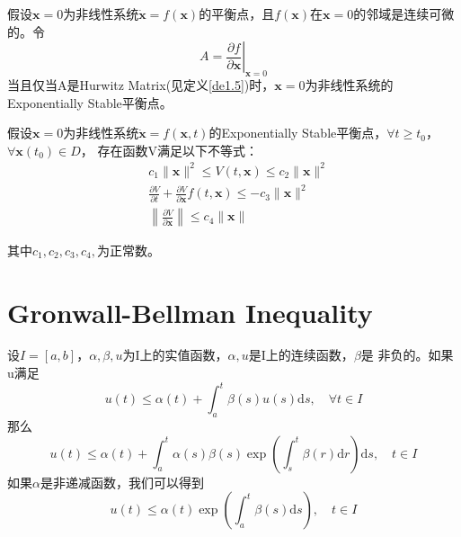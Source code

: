 \documentclass[lang=cn,10pt]{elegantbook}
\newcommand\bv[1]{\boldsymbol{#1}}
\begin{document}
\begin{theorem}
	假设$\bv{x} = 0$为非线性系统$\dot{\bv{x}}=f(\bv{x})$的平衡点，且$f(\bv{x})$在$\bv{x} = 0$的邻域是连续可微的。令
	\begin{equation}
		A=\left.\frac{\partial f}{\partial \bv{x}}\right|_{\bv{x}=0}
	\end{equation}
	当且仅当A是Hurwitz Matrix(见定义\ref{de1.5})时，$\bv{x}=0$为非线性系统的Exponentially Stable平衡点。
\end{theorem}

\begin{theorem}
	假设$\bv{x} = 0$为非线性系统$\dot{\bv{x}}=f(\bv{x},t)$的Exponentially Stable平衡点，$\forall t \geq t_0$，$\forall \bv{x}(t_0) \in D$，
	存在函数V满足以下不等式：
	\begin{equation}
		\begin{aligned}
			 & c_{1}\|\bv{x}\|^{2}\leq V(t,\bv{x})\leq c_{2}\|\bv{x}\|^{2}                                         \\
			 & \frac{\partial V}{\partial t}+\frac{\partial V}{\partial \bv{x}}f(t,\bv{x})\leq-c_{3}\|\bv{x}\|^{2} \\
			 & \left\|{\frac{\partial V}{\partial \bv{x}}}\right\|\leq c_{4}\|\bv{x}\|
		\end{aligned}
	\end{equation}
	\par 其中$c_1,c_2,c_3,c_4,$为正常数。
\end{theorem}

\section{Gronwall-Bellman Inequality}
\begin{theorem}
	设$I=[a,b]$，$\alpha,\beta,u$为I上的实值函数，$\alpha,u$是I上的连续函数，$\beta$是
	非负的。如果u满足
	\begin{equation}\label{eq3.4}
		u(t)\leq\alpha(t)+\int_a^t\beta(s)u(s)\mathrm{d}s,\quad\forall t\in I
	\end{equation}
	那么
	\begin{equation}\label{eq3.5}
		u(t)\leq\alpha(t)+\int_a^t\alpha(s)\beta(s)\exp\left(\int_s^t\beta(r)\mathrm{d}r\right)\mathrm{d}s,\quad t\in I
	\end{equation}
	如果$\alpha$是非递减函数，我们可以得到
	\begin{equation}\label{eq3.6}
		u(t)\leq\alpha(t)\exp\left(\int_{a}^{t}\beta(s)\mathrm{d}s\right),\quad t\in I
	\end{equation}
\end{theorem}
\end{document}
